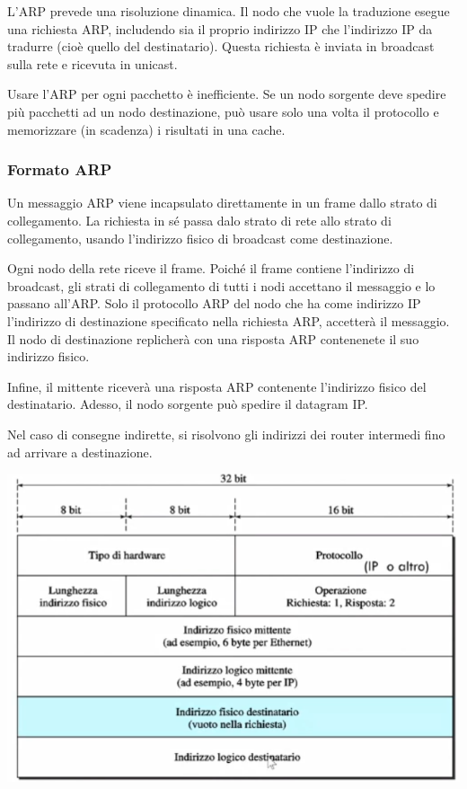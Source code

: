         L'ARP prevede una risoluzione dinamica. Il nodo che vuole la traduzione esegue una richiesta ARP, includendo sia il proprio indirizzo IP che l'indirizzo IP da tradurre (cioè quello del destinatario). Questa richiesta è inviata in broadcast sulla rete e ricevuta in unicast.
        
        Usare l'ARP per ogni pacchetto è inefficiente. Se un nodo sorgente deve spedire più pacchetti ad un nodo destinazione, può usare solo una volta il protocollo e memorizzare (in scadenza) i risultati in una cache.
        
        \subsubsection{Formato ARP}
        
            Un messaggio ARP viene incapsulato direttamente in un frame dallo strato di collegamento. La richiesta in sé passa dalo strato di rete allo strato di collegamento, usando l'indirizzo fisico di broadcast come destinazione.
            
            Ogni nodo della rete riceve il frame. Poiché il frame contiene l'indirizzo di broadcast, gli strati di collegamento di tutti i nodi accettano il messaggio e lo passano all'ARP. Solo il protocollo ARP del nodo che ha come indirizzo IP l'indirizzo di destinazione specificato nella richiesta ARP, accetterà il messaggio. Il nodo di destinazione replicherà con una risposta ARP contenenete il suo indirizzo fisico.
            
            Infine, il mittente riceverà una risposta ARP contenente l'indirizzo fisico del destinatario. Adesso, il nodo sorgente può spedire il datagram IP.
            
            \vspace{3mm}
            
            Nel caso di consegne indirette, si risolvono gli indirizzi dei router intermedi fino ad arrivare a destinazione.
        
            \begin{center}
                \includegraphics[scale=0.5]{images/ARP.png}
            \end{center}
            

